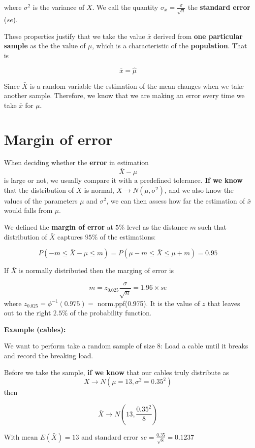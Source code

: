 \documentclass[
]{book}
\begin{document}
where \(\sigma^2\) is the variance of \(X\). We call the quantity \(\sigma_{\bar{x}}=\frac{\sigma}{\sqrt{n}}\) the \textbf{standard error} (\(se\)).

These properties justify that we take the value \(\bar{x}\) derived from \textbf{one particular sample} as the the value of \(\mu\), which is a characteristic of the \textbf{population}. That is

\[\bar{x}=\hat{\mu}\]

Since \(\bar{X}\) is a random variable the estimation of the mean changes when we take another sample. Therefore, we know that we are making an error every time we take \(\bar{x}\) for \(\mu\).

\hypertarget{margin-of-error-1}{%
\section{Margin of error}\label{margin-of-error-1}}

When deciding whether the \textbf{error} in estimation \[\bar{X}-\mu\] is large or not, we usually compare it with a predefined tolerance. \textbf{If we know} that the distribution of \(X\) is normal, \(X \rightarrow N(\mu, \sigma^2)\), and we also know the values of the parameters \(\mu\) and \(\sigma^2\), we can then assess how far the estimation of \(\bar{x}\) would falls from \(\mu\).

We defined the \textbf{margin of error} at \(5\%\) level as the distance \(m\) such that distribution of \(\bar{X}\) captures \(95\%\) of the estimations:

\[P(-m \leq \bar{X}-\mu \leq m)=P(\mu-m \leq \bar{X} \leq\mu + m)=0.95\]

If \(\bar{X}\) is normally distributed then the marging of error is

\[m=z_{0.025} \frac{\sigma}{\sqrt{n}}=1.96\times se\]
where \(z_{0.025}=\phi^{-1}(0.975)=\) norm.ppf(0.975). It is the value of \(z\) that leaves out to the right \(2.5\%\) of the probability function.

\textbf{Example (cables):}

We want to perform take a random sample of size \(8\): Load a cable until it breaks and record the breaking load.

Before we take the sample, \textbf{if we know} that our cables truly distribute as \[X \rightarrow N(\mu=13, \sigma^2=0.35^2)\] then

\[\bar{X} \rightarrow N(13, \frac{0.35^2}{8})\]

With mean \(E(\bar{X})=13\) and standard error \(se=\frac{0.35}{\sqrt{8}}=0.1237\)
\end{document}
